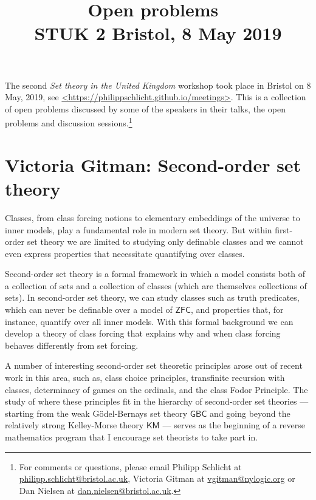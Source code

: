 \documentclass{amsart}
\title{Open problems\ \\ 
STUK 2 Bristol, 8 May 2019}
\theoremstyle{definition}
\newcommand{\ZFC}{\mathsf{ZFC}}
\newcommand{\GBC}{\mathsf{GBC}}
\newcommand{\KM}{\mathsf{KM}}
\begin{document}
\maketitle

The second \emph{Set theory in the United Kingdom} workshop took place in Bristol on 8 May, 2019, see \url{<https://philippschlicht.github.io/meetings>}. 
This is a collection of open problems discussed by some of the speakers in their talks, the open problems and discussion sessions.\footnote{%
For comments or questions, please email Philipp Schlicht at \href{mailto:philipp.schlicht@bristol.ac.uk} {philipp.schlicht@bristol.ac.uk}, Victoria Gitman at \href{mailto:vgitman@nylogic.org}{vgitman@nylogic.org} or Dan Nielsen at \href{mailto:dan.nielsen@bristol.ac.uk}{dan.nielsen@bristol.ac.uk}.} 

\section{Victoria Gitman: Second-order set theory}

Classes, from class forcing notions to elementary embeddings of the universe to inner models, play a fundamental role in modern set theory. But within first-order set theory we are limited to studying only definable classes and we cannot even express properties that necessitate quantifying over classes. 

Second-order set theory is a formal framework in which a model consists both of a collection of sets and a collection of classes (which are themselves collections of sets). In second-order set theory, we can study classes such as truth predicates, which can never be definable over a model of $\ZFC$, and properties that, for instance, quantify over all inner models. With this formal background we can develop a theory of class forcing that explains why and when class forcing behaves differently from set forcing. 


A number of interesting second-order set theoretic principles arose out of recent work in this area, such as, class choice principles, transfinite recursion with classes, determinacy of games on the ordinals, and the class Fodor Principle. The study of where these principles fit in the hierarchy of second-order set theories --- starting from the weak G\"odel-Bernays set theory $\GBC$ and going beyond the relatively strong Kelley-Morse theory $\KM$ --- serves as the beginning of a reverse mathematics program that I encourage set theorists to take part in.
\end{document}

